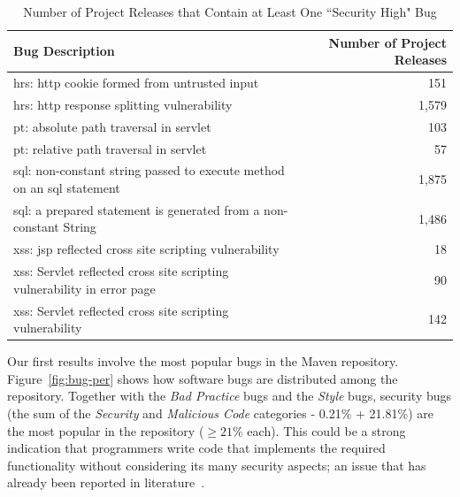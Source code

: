 \documentclass{sig-alternate}
\begin{document}
\begin{table}[t]
\centering
\caption{Number of Project Releases that Contain at Least One ``Security
  High" Bug}
\label{tbl:sev}
\leavevmode
	\begin{tabular}{p{31em} r}
	\hline
	Bug Description & Number of Project Releases\\
 	\hline
	{\sc hrs}: {\sc http} cookie formed from untrusted input & 151\\
	{\sc hrs}: {\sc http} response splitting vulnerability & 1,579\\
	{\sc pt}: absolute path traversal in servlet  & 103\\
	{\sc pt}: relative path traversal in servlet & 57\\
	{\sc sql}: non-constant string passed to execute method on an {\sc sql} statement & 1,875\\
	{\sc sql}: a prepared statement is generated from a non-constant String & 1,486\\
	{\sc xss}: {\sc jsp} reflected cross site scripting vulnerability & 18\\
	{\sc xss}: Servlet reflected cross site scripting vulnerability in error page & 90\\
	{\sc xss}: Servlet reflected cross site scripting vulnerability & 142\\
	\hline
	\end{tabular}
\end{table}

Our first results involve the most popular bugs in the Maven repository.
Figure~\ref{fig:bug-per} shows how software bugs are distributed among the
repository. Together with the {\it Bad Practice} bugs and the {\it Style} bugs,
security bugs (the sum of the {\it Security} and {\it Malicious Code}
categories - 0.21\% + 21.81\%) are the most popular in the repository ($\geq 21\%$ each).
This could be a strong indication that programmers write code
that implements the required functionality without considering its many
security aspects; an issue that has already been reported in
literature~\cite{SH09}.
\end{document}
